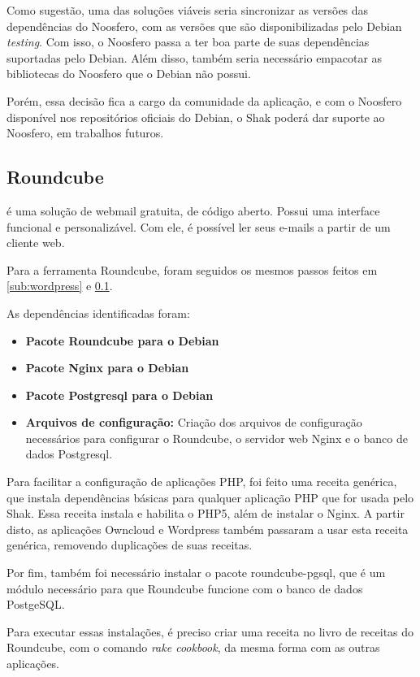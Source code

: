 Como sugestão, uma das soluções viáveis seria 
sincronizar as versões das dependências do Noosfero, com as versões que são 
disponibilizadas pelo Debian \textit{testing}. Com isso, o 
Noosfero passa a ter boa parte de suas dependências suportadas pelo Debian. Além disso, 
também seria necessário empacotar as bibliotecas do Noosfero que o Debian não possui. 

Porém, essa decisão fica a cargo da comunidade da aplicação, e com o Noosfero disponível
nos repositórios oficiais do Debian, o Shak poderá dar suporte ao Noosfero, 
em trabalhos futuros.

 \subsection{Roundcube}
\label{sub:owncloud}

 é uma solução de webmail gratuita, de código 
aberto. Possui uma interface funcional e personalizável. Com ele, é possível
ler seus e-mails a partir de um cliente web. 

Para a ferramenta Roundcube, foram seguidos os mesmos passos feitos em 
\ref{sub:wordpress} e \ref{sub:owncloud}.

As dependências identificadas foram:

\begin{itemize}
   \item \textbf{Pacote Roundcube para o Debian}
   \item \textbf{Pacote Nginx para o Debian}
   \item \textbf{Pacote Postgresql para o Debian}
   \item \textbf{Arquivos de configuração:} Criação dos arquivos de configuração
   necessários para configurar o Roundcube, o servidor web Nginx e o banco de dados
   Postgresql.
\end{itemize}

Para facilitar a configuração de aplicações PHP, foi feito uma receita genérica,
que instala dependências básicas para qualquer aplicação PHP que for usada pelo
Shak. Essa receita instala e habilita o PHP5, além de instalar o Nginx. A partir
disto, as aplicações Owncloud e Wordpress também passaram a usar esta receita
genérica, removendo duplicações de suas receitas.

Por fim, também foi necessário instalar o pacote roundcube-pgsql, que é um módulo 
necessário para que Roundcube funcione com o banco de dados PostgeSQL.
 
Para executar essas instalações, é preciso criar uma receita no livro de receitas
do Roundcube, com o comando \textit{rake cookbook}, da mesma forma com as outras aplicações.
 
